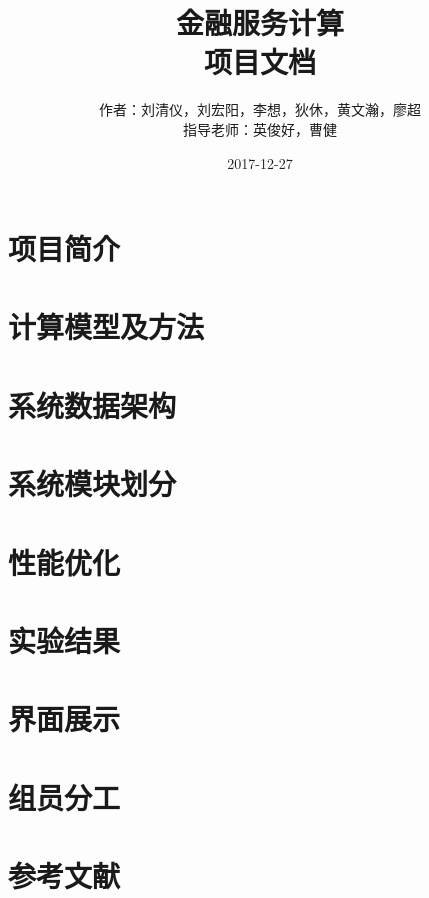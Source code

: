 \documentclass[12pt]{article}
\begin{document}
\begin{CJK}{UTF8}{song}

\newcommand{\bN}{\mathbb{N}}
\newcommand{\tabincell}[2]{\begin{tabular}{@{}#1@{}}#2\end{tabular}}  

\title{金融服务计算\\项目文档}
\date{2017-12-27}
\author{作者：刘清仪，刘宏阳，李想，狄休，黄文瀚，廖超\\指导老师：英俊好，曹健}



\maketitle

\tableofcontents

\newpage
\section{项目简介}

 

\newpage
\section{计算模型及方法}


\newpage
\section{系统数据架构}


\newpage
\section{系统模块划分}


\newpage
\section{性能优化}


\newpage
\section{实验结果}


\newpage
\section{界面展示}


\newpage
\section{组员分工}



\newpage
\section{参考文献}



\end{CJK}
\end{document}
